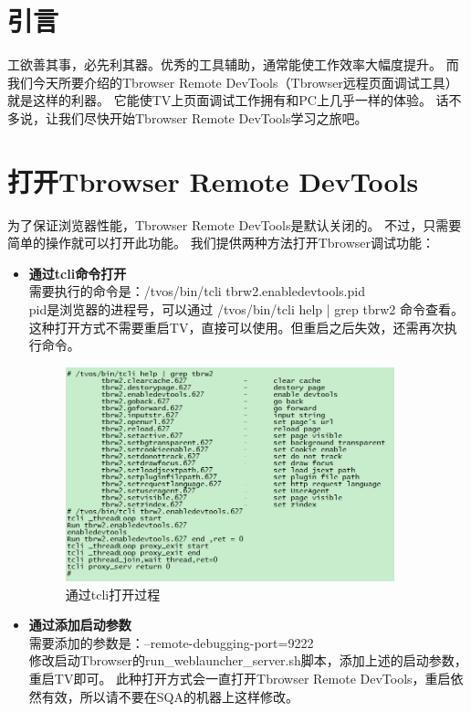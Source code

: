 \section{引言}
工欲善其事，必先利其器。优秀的工具辅助，通常能使工作效率大幅度提升。
而我们今天所要介绍的Tbrowser Remote DevTools（Tbrowser远程页面调试工具）就是这样的利器。
它能使TV上页面调试工作拥有和PC上几乎一样的体验。
话不多说，让我们尽快开始Tbrowser Remote DevTools学习之旅吧。

\section{打开Tbrowser Remote DevTools}
为了保证浏览器性能，Tbrowser Remote DevTools是默认关闭的。
不过，只需要简单的操作就可以打开此功能。
我们提供两种方法打开Tbrowser调试功能：

\begin{itemize}
  \item \textbf{通过tcli命令打开}\\
  需要执行的命令是：/tvos/bin/tcli tbrw2.enabledevtools.pid\\
  pid是浏览器的进程号，可以通过 /tvos/bin/tcli help | grep tbrw2 命令查看。\\
  这种打开方式不需要重启TV，直接可以使用。但重启之后失效，还需再次执行命令。
  \begin{figure}[H] 
  \centering 
  \includegraphics[width=0.9\textwidth]{image/devtools_study/tcli_command.PNG} 
  \caption{通过tcli打开过程} \label{fig:tcli_command} 
  \end{figure}
  
  \item \textbf{通过添加启动参数}\\
  需要添加的参数是：--remote-debugging-port=9222\\
  修改启动Tbrowser的run\_weblauncher\_server.sh脚本，添加上述的启动参数，重启TV即可。
  此种打开方式会一直打开Tbrowser Remote DevTools，重启依然有效，所以请不要在SQA的机器上这样修改。
\end{itemize}

